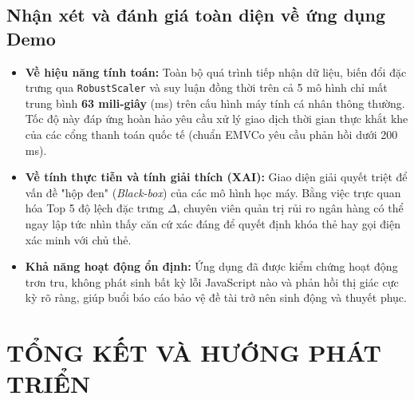 \documentclass[13pt,a4paper]{extarticle}
\begin{document}
\subsection{Nhận xét và đánh giá toàn diện về ứng dụng Demo}
\begin{itemize}
    \item \textbf{Về hiệu năng tính toán:} Toàn bộ quá trình tiếp nhận dữ liệu, biến đổi đặc trưng qua \texttt{RobustScaler} và suy luận đồng thời trên cả 5 mô hình chỉ mất trung bình \textbf{63 mili-giây} (ms) trên cấu hình máy tính cá nhân thông thường. Tốc độ này đáp ứng hoàn hảo yêu cầu xử lý giao dịch thời gian thực khắt khe của các cổng thanh toán quốc tế (chuẩn EMVCo yêu cầu phản hồi dưới 200 ms).
    \item \textbf{Về tính thực tiễn và tính giải thích (XAI):} Giao diện giải quyết triệt để vấn đề "hộp đen" (\textit{Black-box}) của các mô hình học máy. Bằng việc trực quan hóa Top 5 độ lệch đặc trưng $\Delta$, chuyên viên quản trị rủi ro ngân hàng có thể ngay lập tức nhìn thấy căn cứ xác đáng để quyết định khóa thẻ hay gọi điện xác minh với chủ thẻ.
    \item \textbf{Khả năng hoạt động ổn định:} Ứng dụng đã được kiểm chứng hoạt động trơn tru, không phát sinh bất kỳ lỗi JavaScript nào và phản hồi thị giác cực kỳ rõ ràng, giúp buổi báo cáo bảo vệ đề tài trở nên sinh động và thuyết phục.
\end{itemize}

\newpage
\section{TỔNG KẾT VÀ HƯỚNG PHÁT TRIỂN}
\end{document}
